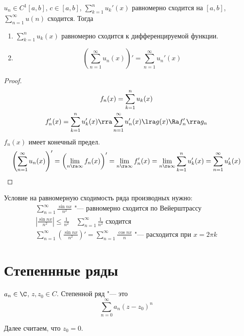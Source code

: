 \begin{conseq}
	$u_n \in C^1[a, b]$, $c \in [a, b]$, $\sum_{k=1}^n u_k'(x)$ равномерно сходится на $[a, b]$, $\sum_{n=1}^\infty u(n)$ сходится.
	Тогда
	\begin{enumerate}
		\item $\sum_{k=1}^n u_k(x)$ равномерно сходится к дифференцируемой функции.
		\item \[ \left(\sum_{n=1}^\infty u_n(x)\right)' = \sum_{n=1}^\infty u_n'(x) \]
	\end{enumerate}
\end{conseq}
\begin{proof}
	\begin{gather*}
		f_n(x) = \sum_{k=1}^n u_k(x) \\
		f_n'(x) = \sum_{k=1}^n u_k'(x) \rra \sum_{n=1}^\infty u_n'(x) \lra g(x) \Ra f_n' \rra g_n
	\end{gather*}
	$f_n(x)$ имеет конечный предел.
	\begin{gather*}
		\left( \sum_{n=1}^\infty u_n(x) \right)'
		= \left( \lim_{n \ra \infty} f_n(x) \right)'
		= \lim_{n \ra \infty} f_n'(x)
		= \lim_{n \ra \infty} \sum_{k=1}^n u_k'(x)
		= \sum_{n=1}^\infty u_k'(x)
	\end{gather*}
\end{proof}

\begin{exmp}
	Условие на равномерную сходимость ряда производных нужно:
	\begin{gather*}
		\sum_{n=1}^\infty \frac{\sin nx}{n^2} \text{ "--- равномерно сходится по Вейерштрассу} \\
		\left|\frac{\sin nx}{n^2}\right| \le \frac1{n^2} \quad \sum_{n=1}^\infty \frac1{n^2} \text{ сходится} \\
		\sum_{n=1}^\infty \left(\frac{\sin nx}{n^2}\right)' = \sum_{n=1}^\infty \frac{\cos nx}{n} \text{ "--- расходится при $x=2\pi k$}
	\end{gather*}
\end{exmp}

\section{Степеннные ряды}

\begin{Def}
	$a_n \in \C$, $z, z_0 \in C$.
	Степенной ряд "--- это
	\[ \sum_{n=0}^\infty a_n (z - z_0)^n \]
\end{Def}

\begin{Rem}
	Далее считаем, что $z_0 = 0$.
\end{Rem}


